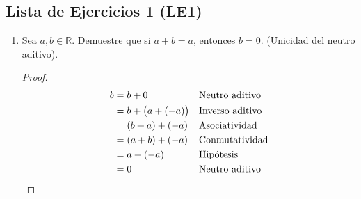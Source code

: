 \documentclass[11pt]{article}
\newcommand{\R}{\mathbb{R}}
\begin{document}
\pagebreak

\subsection*{Lista de Ejercicios 1 (LE1)}

\begin{enumerate}[label=\alph*)]
    \item Sea $a,b\in \R$. Demuestre que si $a+b=a$, entonces $b=0$. (Unicidad del neutro aditivo).
    \vspace{-1em}\begin{proof}
        \begin{align*}
            b &= b + 0 && \text{Neutro aditivo}\\
            &= b + \bigl(a+(-a)\bigr) && \text{Inverso aditivo}\\
            &= (b+a) + (-a) && \text{Asociatividad}\\
            &= (a+b) + (-a) && \text{Conmutatividad}\\
            &= a + (-a) && \text{Hipótesis}\\
            &= 0 && \text{Neutro aditivo} \qedhere
        \end{align*}
    \end{proof} \vspace{-1em}
    

\end{enumerate}
\end{document}
